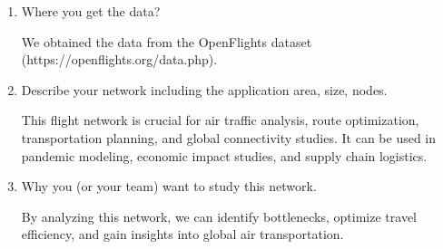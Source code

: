 \documentclass{amsart}
\theoremstyle{definition}
\theoremstyle{remark}
\numberwithin{equation}{section}
\begin{document}
\begin{enumerate}
\begin{enumerate}
\vspace{0.5cm}

\item Where you get the data? \vspace{0.5cm}

We obtained the data from the OpenFlights dataset (https://openflights.org/data.php).

\vspace{0.5cm}

\item Describe your network including the application area, size, nodes. \vspace{0.5cm}

This flight network is crucial for air traffic analysis, route optimization, transportation planning, and global connectivity studies.
It can be used in pandemic modeling, economic impact studies, and supply chain logistics.

\vspace{0.5cm}

\item Why you (or your team) want to study this network. \vspace{0.5cm}

By analyzing this network, we can identify bottlenecks, optimize travel efficiency, and gain insights into global air transportation.

\vspace{0.5cm}

\end{enumerate}

\end{enumerate}
\end{document}
